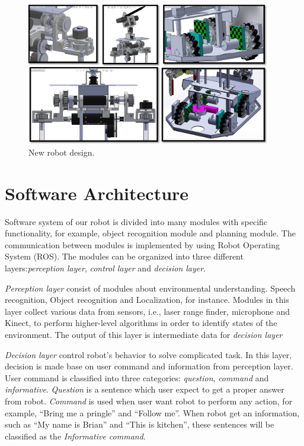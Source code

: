 \documentclass{llncs}
\newcommand{\dq}[1]{``#1''}
\begin{document}
\begin{figure}
\centering
\includegraphics[height=6.2cm]{hardware}
\caption{New robot design.}
\label{fig:base}
\end{figure}

\section{Software Architecture}
Software system of our robot is divided into many modules with specific functionality, for example, object recognition module and planning module. The communication between modules is implemented by using Robot Operating System (ROS). The modules can be organized into three different layers:\textit{perception layer}, \textit{control layer} and \textit{decision layer}.

\textit{Perception layer} consist of modules about environmental understanding. Speech recognition, Object recognition and Localization, for instance. Modules in this layer collect various data from sensors, i.e., laser range finder, microphone and Kinect, to perform higher-level algorithms in order to identify states of the environment. The output of this layer is intermediate data for \textit{decision layer}

\textit{Decision layer} control robot's behavior to solve complicated task. In this layer, decision is made base on user command and information from perception layer. User command is classified into three categories: \textit{question}, \textit{command} and \textit{informative}. \textit{Question} is a sentence which user expect to get a proper answer from robot. \textit{Command} is used when user want robot to perform any action, for example, \dq{Bring me a pringle} and \dq{Follow me}. When robot get an information, such as \dq{My name is Brian} and \dq{This is kitchen}, these sentences will be classified as the \textit{Informative command}.
\end{document}
